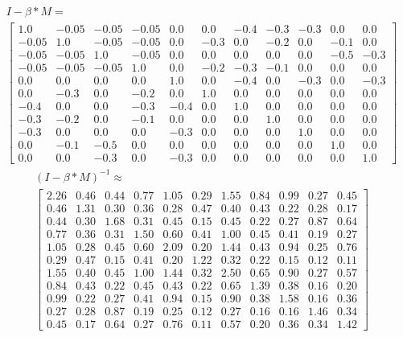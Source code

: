 \begin{gather}
	\nonumber I - \beta * M = \\
	\begin{bmatrix}
		1.0 & -0.05 & -0.05 & -0.05 & 0.0 & 0.0 & -0.4 & -0.3 & -0.3 & 0.0 & 0.0\\
		-0.05 & 1.0 & -0.05 & -0.05 & 0.0 & -0.3 & 0.0 & -0.2 & 0.0 & -0.1 & 0.0\\
		-0.05 & -0.05 & 1.0 & -0.05 & 0.0 & 0.0 & 0.0 & 0.0 & 0.0 & -0.5 & -0.3\\
		-0.05 & -0.05 & -0.05 & 1.0 & 0.0 & -0.2 & -0.3 & -0.1 & 0.0 & 0.0 & 0.0\\
		0.0 & 0.0 & 0.0 & 0.0 & 1.0 & 0.0 & -0.4 & 0.0 & -0.3 & 0.0 & -0.3\\
		0.0 & -0.3 & 0.0 & -0.2 & 0.0 & 1.0 & 0.0 & 0.0 & 0.0 & 0.0 & 0.0\\
		-0.4 & 0.0 & 0.0 & -0.3 & -0.4 & 0.0 & 1.0 & 0.0 & 0.0 & 0.0 & 0.0\\
		-0.3 & -0.2 & 0.0 & -0.1 & 0.0 & 0.0 & 0.0 & 1.0 & 0.0 & 0.0 & 0.0\\
		-0.3 & 0.0 & 0.0 & 0.0 & -0.3 & 0.0 & 0.0 & 0.0 & 1.0 & 0.0 & 0.0\\
		0.0 & -0.1 & -0.5 & 0.0 & 0.0 & 0.0 & 0.0 & 0.0 & 0.0 & 1.0 & 0.0\\
		0.0 & 0.0 & -0.3 & 0.0 & -0.3 & 0.0 & 0.0 & 0.0 & 0.0 & 0.0 & 1.0
	\end{bmatrix}
	\label{frml:katzZentralitaetPseudoMitarbeiter:formel3}
\end{gather}
\begin{gather}
	\nonumber (I - \beta * M)^{-1} \approx\\
	\begin{bmatrix}
		2.26 & 0.46 & 0.44 & 0.77 & 1.05 & 0.29 & 1.55 & 0.84 & 0.99 & 0.27 & 0.45\\
		0.46 & 1.31 & 0.30 & 0.36 & 0.28 & 0.47 & 0.40 & 0.43 & 0.22 & 0.28 & 0.17\\
		0.44 & 0.30 & 1.68 & 0.31 & 0.45 & 0.15 & 0.45 & 0.22 & 0.27 & 0.87 & 0.64\\
		0.77 & 0.36 & 0.31 & 1.50 & 0.60 & 0.41 & 1.00 & 0.45 & 0.41 & 0.19 & 0.27\\
		1.05 & 0.28 & 0.45 & 0.60 & 2.09 & 0.20 & 1.44 & 0.43 & 0.94 & 0.25 & 0.76\\
		0.29 & 0.47 & 0.15 & 0.41 & 0.20 & 1.22 & 0.32 & 0.22 & 0.15 & 0.12 & 0.11\\
		1.55 & 0.40 & 0.45 & 1.00 & 1.44 & 0.32 & 2.50 & 0.65 & 0.90 & 0.27 & 0.57\\
		0.84 & 0.43 & 0.22 & 0.45 & 0.43 & 0.22 & 0.65 & 1.39 & 0.38 & 0.16 & 0.20\\
		0.99 & 0.22 & 0.27 & 0.41 & 0.94 & 0.15 & 0.90 & 0.38 & 1.58 & 0.16 & 0.36\\
		0.27 & 0.28 & 0.87 & 0.19 & 0.25 & 0.12 & 0.27 & 0.16 & 0.16 & 1.46 & 0.34\\
		0.45 & 0.17 & 0.64 & 0.27 & 0.76 & 0.11 & 0.57 & 0.20 & 0.36 & 0.34 & 1.42 
	\end{bmatrix}
	\label{frml:katzZentralitaetPseudoMitarbeiter:formel4}
\end{gather}
